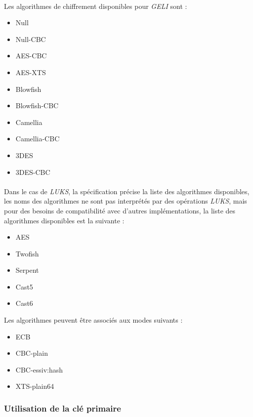 \paragraph{}
Les algorithmes de chiffrement disponibles pour {\em GELI} \cite{geli.h} sont :
\begin{itemize}
	\item Null
	\item Null-CBC
	\item AES-CBC
	\item AES-XTS
	\item Blowfish
	\item Blowfish-CBC
	\item Camellia
	\item Camellia-CBC
	\item 3DES
	\item 3DES-CBC
\end{itemize}

\paragraph{}
Dans le cas de {\em LUKS}, la spécification \cite{onDiskFormatLuks} précise
la liste des algorithmes disponibles, les noms des algorithmes ne sont pas 
interprétés par des opérations {\em LUKS}, mais pour des besoins de 
compatibilité avec d'autres implémentations, la liste des algorithmes 
disponibles est la suivante :
\begin{itemize}
	\item AES
	\item Twofish
	\item Serpent
	\item Cast5
	\item Cast6
\end{itemize}
Les algorithmes peuvent être associés aux modes suivants :
\begin{itemize}
	\item ECB
	\item CBC-plain
	\item CBC-essiv:hash
	\item XTS-plain64
\end{itemize}

\subsubsection{Utilisation de la clé primaire}
